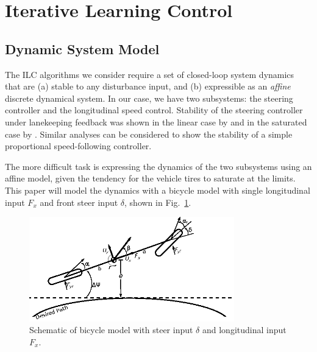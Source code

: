 \documentclass[9pt,shortpaper,twoside,web]{ieeecolor}
\begin{document}
\section{Iterative Learning Control}

\subsection{Dynamic System Model}
\label{sec:ch4dsm}
The ILC algorithms we consider require a set of closed-loop system dynamics that are (a) stable to any disturbance input, and (b) expressible as an \textit{affine} discrete dynamical system. In our case, we have two subsystems: the steering controller and the longitudinal speed control. Stability of the steering controller
under lanekeeping feedback was shown in the linear case by \cite{rossetter2002} and in the saturated case by \cite{talvala}. Similar analyses can be considered to show the stability of a simple proportional speed-following controller.

The more difficult task is expressing the dynamics of the two subsystems using an affine model, given the tendency for the vehicle tires to saturate at the limits. This paper will model the dynamics with a bicycle model with single longitudinal input $F_x$ and front steer input $\delta$, shown in Fig.~\ref{fig:bikemodel}.

\begin{figure}[h]
\centering
\includegraphics[width=3.5in]{figures/BikeModelSchematic.eps}
\caption{Schematic of bicycle model with steer input $\delta$ and longitudinal input $F_x$.}
\label{fig:bikemodel}
\end{figure}


\end{document}

